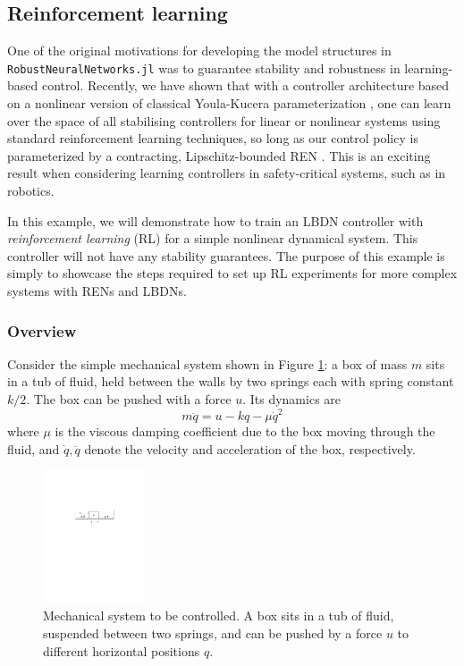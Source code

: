 \subsection{Reinforcement learning} \label{sec:rl}

One of the original motivations for developing the model structures in  \verb|RobustNeuralNetworks.jl| was to guarantee stability and robustness in learning-based control. Recently, we have shown that with a controller architecture based on a nonlinear version of classical Youla-Kucera parameterization \cite{Youla++1976}, one can learn over the space of all stabilising controllers for linear or nonlinear systems using standard reinforcement learning techniques, so long as our control policy is parameterized by a contracting, Lipschitz-bounded REN  \cite{Wang++2022,Barbara++2023}. This is an exciting result when considering learning controllers in safety-critical systems, such as in robotics.

In this example, we will demonstrate how to train an LBDN controller with \textit{reinforcement learning} (RL) for a simple nonlinear dynamical system. This controller will not have any stability guarantees. The purpose of this example is simply to showcase the steps required to set up RL experiments for more complex systems with RENs and LBDNs.

\subsubsection{Overview} \label{sec:rl-overview}

Consider the simple mechanical system shown in Figure \ref{fig:rl-box}: a box of mass $m$ sits in a tub of fluid, held between the walls by two springs each with spring constant $k/2.$ The box can be pushed with a force $u.$ Its dynamics are
\begin{equation} \label{eqn:box-dynamics}
m\ddot{q} = u - kq - \mu \dot{q}^2
\end{equation}
where $\mu$ is the viscous damping coefficient due to the box moving through the fluid, and $\dot{q},\ddot{q}$ denote the velocity and acceleration of the box, respectively.

\begin{figure}[!t]
    \centering
    \includegraphics[width=0.27\textwidth]{Images/mass_rl.pdf}
    \caption{Mechanical system to be controlled. A box sits in a tub of fluid, suspended between two springs, and can be pushed by a force $u$ to different horizontal positions $q$.}
    \label{fig:rl-box}
\end{figure}

